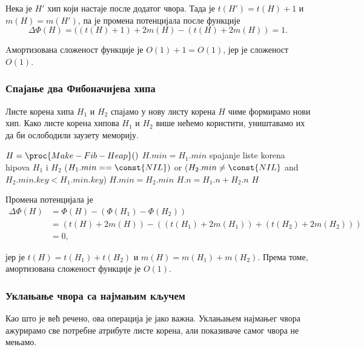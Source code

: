 \documentclass[11pt, a4paper]{article}
\theoremstyle{remark}
\numberwithin{equation}{section}
\begin{document}
	\noindent Нека је $H'$ хип који настаје после додатог чвора. Тада је $t(H')=t(H)+1$ и $m(H)=m(H')$, па је промена потенцијала после функције 	
	\begin{equation}
	\Delta \Phi (H)=((t(H)+1)+2m(H)-(t(H)+2m(H))=1.
	\end{equation}
	
	\noindent Aмортизована сложеност функције  је $O(1)+1=O(1)$, јер је сложеност $O(1)$.

	\subsubsection{Спајање два Фибоначијева хипа}
	
	Листе корена хипа $H_1$ и $H_2$ спајамо у нову листу корена $H$ чиме формирамо нови хип. Како листе корена хипова $H_1$ и $H_2$ више нећемо користити, уништавамо их да би ослободили заузету меморију.
	
	\begin{codebox}
		\li $H=\proc{Make-Fib-Heap}()$
		\li $H.min=H_1 .min$
		\li spajanje liste korena hipova $H_1$ i $H_2$
		\li \If ($H_1 .min==\const{NIL})$ or ($H_2 .min \neq \const{NIL}$ and $H_2 .min.key<H_1 .min.key$)
		\li \Do $H.min=H_2 .min$
		\End
		\li $H.n=H_1 .n+ H_2 .n$
		\li \Return $H$
	\end{codebox}

	\noindent Промена потенцијала је	
	\begin{equation}
	\begin{split}
		\Delta \Phi (H) & =\Phi (H)-(\Phi (H_1) - \Phi (H_2)) \\
		& = (t(H)+2m(H))-((t(H_1)+2m(H_1))+(t(H_2)+2m(H_2))) \\
		& = 0,
	\end{split}
	\end{equation}
	
	\noindent јер је $t(H)=t(H_1)+t(H_2)$ и $m(H)=m(H_1)+m(H_2)$. Према томе, амортизована сложеност функције  је $O(1)$.
	
	\subsubsection{Уклањање чвора са најмањим кључем}
	
	Као што је већ речено, ова операција је јако важна. Уклањањем најмањег чвора ажурирамо све потребне атрибуте листе корена, али показиваче самог чвора не мењамо. \\
	
\end{document}

